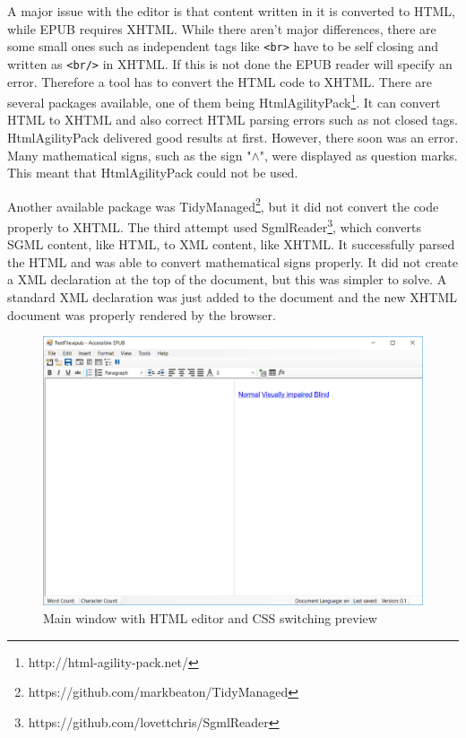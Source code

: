 A major issue with the editor is that content written in it is converted to HTML, while EPUB requires XHTML. While there aren't major differences, there are some small ones such as independent tags like \lstinline|<br>| have to be self closing and written as \lstinline|<br/>| in XHTML. If this is not done the EPUB reader will specify an error. Therefore a tool has to convert the HTML code to XHTML. There are several packages available, one of them being HtmlAgilityPack\footnote{http://html-agility-pack.net/}. It can convert HTML to XHTML and also correct HTML parsing errors such as not closed tags. HtmlAgilityPack delivered good results at first. However, there soon was an error. Many mathematical signs, such as the sign "$\wedge$", were displayed as question marks. This meant that HtmlAgilityPack could not be used. 

Another available package was TidyManaged\footnote{https://github.com/markbeaton/TidyManaged}, but it did not convert the code properly to XHTML. The third attempt used SgmlReader\footnote{https://github.com/lovettchris/SgmlReader}, which converts SGML content, like HTML, to XML content, like XHTML. It successfully parsed the HTML and was able to convert mathematical signs properly. It did not create a XML declaration at the top of the document, but this was simpler to solve. A standard XML declaration was just added to the document and the new XHTML document was properly rendered by the browser.


\begin{figure}
	\begin{center}
		\includegraphics[width=\linewidth]{figures/formCss.png}	
		\caption{Main window with HTML editor and CSS switching preview}
		\label{fig:formCss}
	\end{center}
\end{figure}

